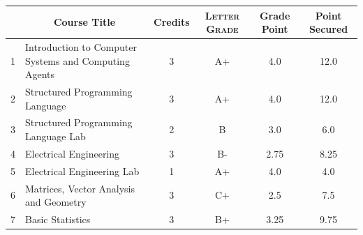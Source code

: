 \documentclass[11pt]{article}
\newcommand*{\numtwo}[1]{\pgfmathprintnumber[
                    fixed, precision=2, fixed zerofill=true]{#1}}
\begin{document}
                \begin{center}
                    \renewcommand{\arraystretch}{1.08}
                    
                \begin{tabular}{|c|l|c|>{\scshape}c|c|c|}
                \hline  \rule[-1ex]{0pt}{3.5ex} {\centering{\bf Course Code}} &  \multicolumn{1}{c|}{\textbf{Course Title}}  & {\bf Credits} & {\bf Letter Grade} & {\bf Grade Point} & {\bf Point Secured}  \\ 
                \hline   1 &  Introduction to Computer Systems and Computing Agents		 & 3 & A+ & 4.0 & 12.0 \\ %
                \hline   2 &  Structured Programming Language		 & 3 & A+ & 4.0 & 12.0 \\ %
                \hline   3 &  Structured Programming Language Lab		 & 2 & B & 3.0 & 6.0 \\ %
                \hline   4 &  Electrical Engineering		 & 3 & B- & 2.75 & 8.25 \\ %
                \hline   5 &  Electrical Engineering Lab		 & 1 & A+ & 4.0 & 4.0 \\ %
                \hline   6 &  Matrices, Vector Analysis and Geometry		 & 3 & C+ & 2.5 & 7.5 \\ %
                \hline   7 &  Basic Statistics		 & 3 & B+ & 3.25 & 9.75 \\ %

\hline                %
                \end{tabular}
                \end{center}
                \renewcommand{\arraystretch}{1.03}
\end{document}
